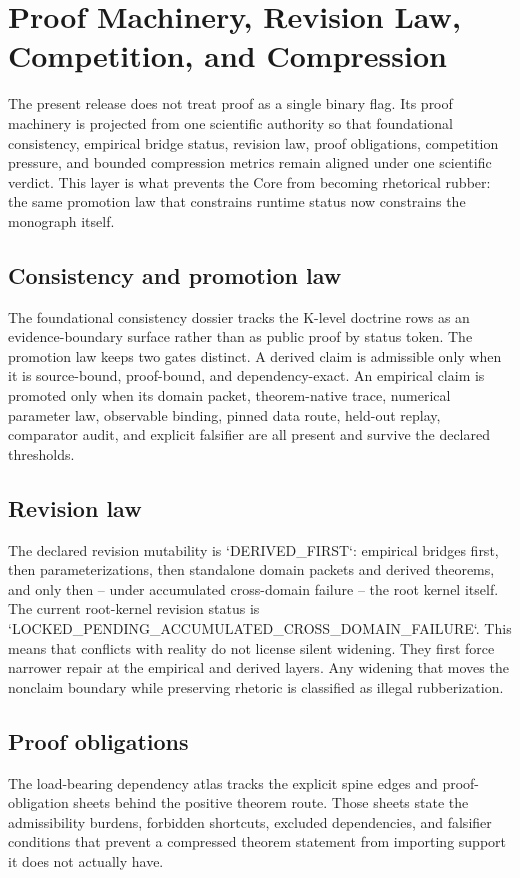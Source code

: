 \section{Proof Machinery, Revision Law, Competition, and Compression}

The present release does not treat proof as a single binary flag. Its proof
machinery is projected from one scientific authority so that foundational
consistency, empirical bridge status, revision law, proof obligations,
competition pressure, and bounded compression metrics remain aligned under one
scientific verdict. This layer is what prevents the Core from becoming
rhetorical rubber: the same promotion law that constrains runtime status now
constrains the monograph itself.

\subsection{Consistency and promotion law}
The foundational consistency dossier tracks the K-level doctrine rows as an evidence-boundary surface rather than as public proof by status token.
The promotion law keeps two gates distinct. A derived claim is admissible only when it is source-bound, proof-bound, and dependency-exact. An empirical claim is promoted only when its domain packet, theorem-native trace, numerical parameter law, observable binding, pinned data route, held-out replay, comparator audit, and explicit falsifier are all present and survive the declared thresholds.

\subsection{Revision law}
The declared revision mutability is `DERIVED\_FIRST`: empirical bridges first, then parameterizations, then standalone domain packets and derived theorems, and only then -- under accumulated cross-domain failure -- the root kernel itself.
The current root-kernel revision status is `LOCKED\_PENDING\_ACCUMULATED\_CROSS\_DOMAIN\_FAILURE`.
This means that conflicts with reality do not license silent widening. They first force narrower repair at the empirical and derived layers. Any widening that moves the nonclaim boundary while preserving rhetoric is classified as illegal rubberization.

\subsection{Proof obligations}
The load-bearing dependency atlas tracks the explicit spine edges and proof-obligation sheets behind the positive theorem route. Those sheets state the admissibility burdens, forbidden shortcuts, excluded dependencies, and falsifier conditions that prevent a compressed theorem statement from importing support it does not actually have.

